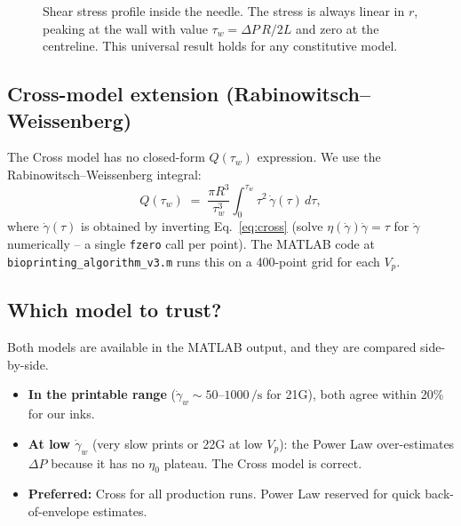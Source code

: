 \documentclass[11pt,a4paper]{article}
\newcommand{\gd}{\dot{\gamma}}
\begin{document}
\begin{figure}[h]
\centering
{}
\caption{Shear stress profile inside the needle. The stress is always
linear in $r$, peaking at the wall with value $\tau_w=\Delta P\,R/2L$
and zero at the centreline. This universal result holds for any
constitutive model.}
\label{fig:stress_profile}
\end{figure}

\subsection{Cross-model extension (Rabinowitsch--Weissenberg)}

The Cross model has no closed-form $Q(\tau_w)$ expression. We use the
Rabinowitsch--Weissenberg integral:
\begin{equation}
Q(\tau_w) \;=\; \frac{\pi R^3}{\tau_w^3}
\int_0^{\tau_w} \tau^2\,\gd(\tau)\, d\tau,
\label{eq:rabinowitsch}
\end{equation}
where $\gd(\tau)$ is obtained by inverting Eq.~\ref{eq:cross} (solve
$\eta(\gd)\gd=\tau$ for $\gd$ numerically -- a single \texttt{fzero}
call per point). The MATLAB code at
\texttt{bioprinting\_algorithm\_v3.m} runs this on a 400-point grid
for each $V_p$.

\subsection{Which model to trust?}

Both models are available in the MATLAB output, and they are compared
side-by-side.

\begin{itemize}[leftmargin=1.6em,itemsep=2pt]
\item \textbf{In the printable range} ($\gd_w\sim 50$--$1000\,\si{\per\s}$
  for 21G), both agree within 20\% for our inks.
\item \textbf{At low $\gd_w$} (very slow prints or 22G at low $V_p$):
  the Power Law over-estimates $\Delta P$ because it has no $\eta_0$
  plateau. The Cross model is correct.
\item \textbf{Preferred:} Cross for all production runs. Power Law
  reserved for quick back-of-envelope estimates.
\end{itemize}
\end{document}
